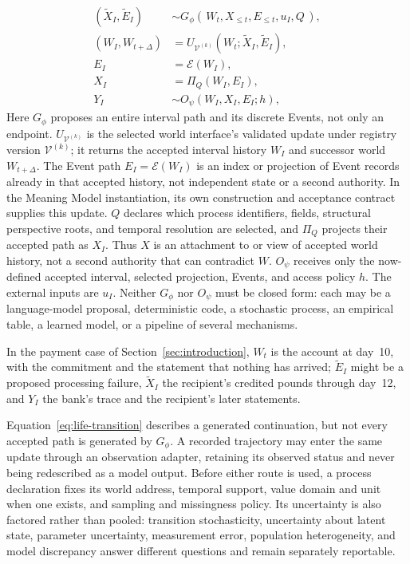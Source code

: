 \documentclass[10pt]{article}
\begin{document}
\begin{align}
  (\widetilde X_I,\widetilde E_I)
    &\sim G_{\phi}(\,W_t,X_{\leq t},E_{\leq t},u_I,Q\,),
    \label{eq:life-transition}\\
  (W_I,W_{t+\Delta})
    &=U_{\mathcal V^{(k)}}(W_t;\widetilde X_I,\widetilde E_I),
    \label{eq:world-interface-update}\\
  E_I&=\mathcal E(W_I),
    \label{eq:event-projection}\\
  X_I&=\Pi_Q(W_I,E_I),
    \label{eq:process-projection}\\
  Y_I
    &\sim O_{\psi}(W_I,X_I,E_I;h),
    \label{eq:life-observation}
\end{align}
Here $G_{\phi}$ proposes an entire interval path and its discrete Events, not
only an endpoint. $U_{\mathcal V^{(k)}}$ is the selected world interface's
validated update under registry version $\mathcal V^{(k)}$; it returns the
accepted interval history $W_I$ and successor world $W_{t+\Delta}$. The Event
path $E_I=\mathcal E(W_I)$ is an index or projection of Event records already
in that accepted history, not independent state or a second authority. In the
Meaning Model instantiation, its own construction and acceptance contract
supplies this update. $Q$ declares which process
identifiers, fields, structural perspective roots, and temporal resolution are selected, and
$\Pi_Q$ projects their accepted path as $X_I$. Thus $X$ is an attachment to or
view of accepted world history, not a second authority that can contradict
$W$. $O_{\psi}$ receives only the now-defined accepted interval, selected
projection, Events, and access policy $h$. The external inputs are
$u_I$. Neither $G_{\phi}$ nor $O_{\psi}$ must be closed form: each may be a
language-model proposal, deterministic code, a stochastic process, an
empirical table, a learned model, or a pipeline of several mechanisms.

In the payment case of Section~\ref{sec:introduction}, $W_t$ is the account at day~10,
with the commitment and the statement that nothing has arrived; $\widetilde E_I$ might
be a proposed processing failure, $\widetilde X_I$ the recipient's credited pounds
through day~12, and $Y_I$ the bank's trace and the recipient's later statements.

Equation~\ref{eq:life-transition} describes a generated continuation, but not
every accepted path is generated by $G_{\phi}$. A recorded trajectory may enter
the same update through an observation adapter, retaining its observed status
and never being redescribed as a model output. Before either route is used, a
process declaration fixes its world address, temporal support, value domain and
unit when one exists, and sampling and missingness policy. Its uncertainty is
also factored rather than pooled: transition stochasticity, uncertainty about
latent state, parameter uncertainty, measurement error, population
heterogeneity, and model discrepancy answer different questions and remain
separately reportable.
\end{document}
